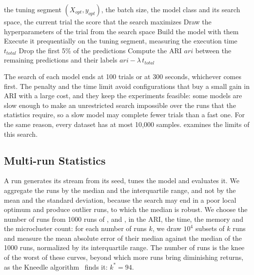 \begin{algorithm}[htbp]
\caption{Objective of the hyperparameter search}
\label{alg:hyperparameter_tuning_objective_function}
\begin{algorithmic}[1]
\Require the tuning segment $(X_{opt}, y_{opt})$, the batch size, the model class and its search space, the current trial
\Ensure the score that the search maximizes
\State Draw the hyperparameters of the trial from the search space
\State Build the model with them
\State Execute it prequentially on the tuning segment, measuring the execution time $t_{total}$
\State Drop the first 5\% of the predictions
\State Compute the ARI $ari$ between the remaining predictions and their labels
\State \Return $ari - \lambda\, t_{total}$
\end{algorithmic}
\end{algorithm}

The search of each model ends at 100 trials or at 300 seconds, whichever comes first. The penalty and the time limit avoid configurations that buy a small gain in ARI with a large cost, and they keep the experiments feasible: some models are slow enough to make an unrestricted search impossible over the runs that the statistics require, so a slow model may complete fewer trials than a fast one. For the same reason, every dataset has at most 10{,}000 samples.  examines the limits of this search.

\subsection{Multi-run Statistics}
\label{subsec:multi_run_statistics}

A run generates its stream from its seed, tunes the model and evaluates it. We aggregate the runs by the median and the interquartile range, and not by the mean and the standard deviation, because the search may end in a poor local optimum and produce outlier runs, to which the median is robust. We choose the number of runs from 1000 runs of , \BenchmarkOne and \BenchmarkTwo, in the ARI, the time, the memory and the microcluster count: for each number of runs $k$, we draw $10^4$ subsets of $k$ runs and measure the mean absolute error of their median against the median of the 1000 runs, normalized by its interquartile range. The number of runs is the knee of the worst of these curves, beyond which more runs bring diminishing returns, as the Kneedle algorithm~\cite{satopaa2011kneedle} finds it: $k^* = 94$.

